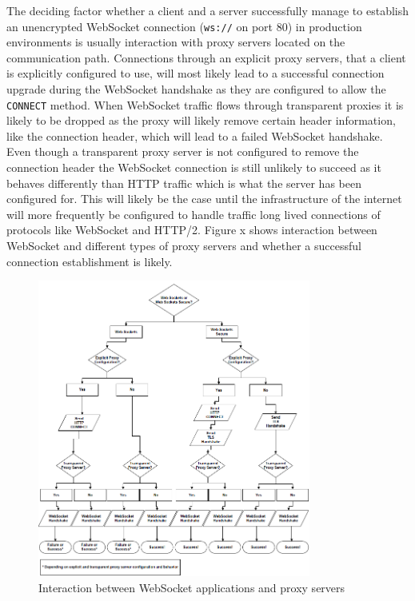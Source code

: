 The deciding factor whether a client and a server successfully manage to establish an unencrypted WebSocket connection (\texttt{ws://} on port 80) in production environments is usually interaction with proxy servers located on the communication path. Connections through an explicit proxy servers, that a client is explicitly configured to use, will most likely lead to a successful connection upgrade during the WebSocket handshake as they are configured to allow the \texttt{CONNECT} method. When WebSocket traffic flows through transparent proxies it is likely to be dropped as the proxy will likely remove certain header information, like the connection header, which will lead to a failed WebSocket handshake. Even though a transparent proxy server is not configured to remove the connection header the WebSocket connection is still unlikely to succeed as it behaves differently than HTTP traffic which is what the server has been configured for. This will likely be the case until the infrastructure of the internet will more frequently be configured to handle traffic long lived connections of protocols like WebSocket and HTTP/2. Figure x shows interaction between WebSocket and different types of proxy servers and whether a successful connection establishment is likely.
\\
\begin{figure}[h!]
	\centering
	\includegraphics[width=0.8\textwidth]{images/websocketProxyServer}
	\caption{Interaction between WebSocket applications and proxy servers \cite{wang2013definitive}}
	\label{fig:webSocketMessagingSystem}
\end{figure}

